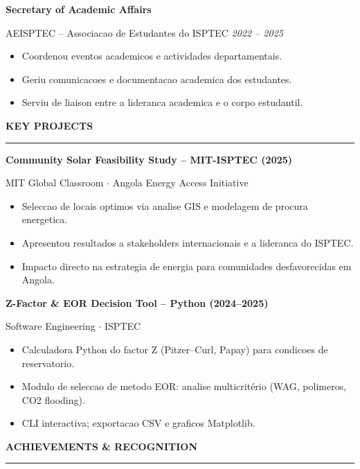 \documentclass[10pt,a4paper]{article}
\renewcommand{\textbf}[1]{{\bfseries\color{cvgold}#1}}
\newcommand{\mainSection}[1]{%
  \vspace{1pt}%
  {\bfseries\color{cvgold}\large\MakeUppercase{#1}}%
  \par\vspace{0pt}%
  {\color{cvgold}\rule{\linewidth}{0.9pt}}%
  \par\vspace{1pt}%
}
\newcommand{\expEntry}[3]{%
  {\bfseries\color{cvgold}\normalsize #1}\par\vspace{1pt}%
  {\color{cvmuted}\small #2 \hfill \textit{\color{cvgoldlt}#3}}\par\vspace{1pt}%
}
\begin{document}
\begin{minipage}[t]{\dimexpr 0.705\paperwidth - 26pt}
  \vspace{2pt}
  \expEntry{Secretary of Academic Affairs}%
           {AEISPTEC -- Associacao de Estudantes do ISPTEC}%
           {2022 -- 2025}
  \begin{itemize}
    \item Coordenou eventos academicos e actividades departamentais.
    \item Geriu comunicacoes e documentacao academica dos estudantes.
    \item Serviu de liaison entre a lideranca academica e o corpo estudantil.
  \end{itemize}

  \mainSection{Key Projects}

  \textbf{Community Solar Feasibility Study -- MIT-ISPTEC (2025)}\par
  {\color{cvgoldlt}\small MIT Global Classroom $\cdot$ Angola Energy Access Initiative}
  \begin{itemize}
    \item Seleccao de locais optimos via analise GIS e modelagem de procura energetica.
    \item Apresentou resultados a stakeholders internacionais e a lideranca do ISPTEC.
    \item Impacto directo na estrategia de energia para comunidades desfavorecidas em Angola.
  \end{itemize}

  \vspace{2pt}
  \textbf{Z-Factor \& EOR Decision Tool -- Python (2024--2025)}\par
  {\color{cvgoldlt}\small Software Engineering $\cdot$ ISPTEC}
  \begin{itemize}
    \item Calculadora Python do factor Z (Pitzer--Curl, Papay) para condicoes de reservatorio.
    \item Modulo de seleccao de metodo EOR: analise multicritério (WAG, polimeros, CO2 flooding).
    \item CLI interactiva; exportacao CSV e graficos Matplotlib.
  \end{itemize}

  \mainSection{Achievements \& Recognition}


\end{minipage}
\end{document}

